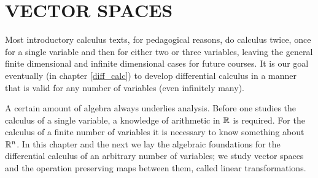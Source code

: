 \chapter{VECTOR SPACES}\label{v_sps}

Most introductory calculus texts, for pedagogical reasons, do calculus twice, once for a
single variable and then for either two or three variables, leaving the general finite
dimensional and infinite dimensional cases for future courses.  It is our goal eventually (in
chapter \ref{diff_calc}) to develop differential calculus in a manner that is valid for any
number of variables (even infinitely many).

A certain amount of algebra always underlies analysis. Before one studies the calculus of a
single variable, a knowledge of arithmetic in $\mathbb{R}$ is required.  For the calculus of a finite
number of variables it is necessary to know something about $\mathbb{R}^n$. In this chapter and the
next we lay the algebraic foundations for the differential calculus of an arbitrary number of
variables; we study vector spaces and the operation preserving maps between them, called
linear transformations.





